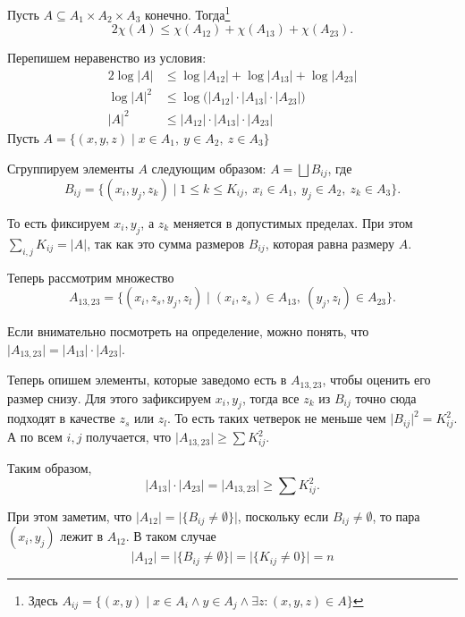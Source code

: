 \begin{lm}
	Пусть $ A \subseteq A_1 \times A_2 \times A_3$ конечно.
	Тогда\footnote{Здесь $ A_{ij} = \{(x, y) \mid x \in A_i \land y \in  A_j \land \exists z\colon  (x, y, z) \in A \}$}
	\[
		2 \chi(A) \le \chi(A_{12}) + \chi(A_{13}) + \chi(A_{23})
	.\] 
\end{lm}
\begin{proof*}
	Перепишем неравенство из условия:
	\begin{align*}
		2 \log \lvert A \rvert &\le \log \lvert A_{12} \rvert  + \log  \lvert A_{13} \rvert  + \log \lvert A_{23} \rvert  \\
		\log \lvert A \rvert^2 & \le \log \bigl(\lvert A_{12} \rvert \cdot \lvert A_{13} \rvert \cdot \lvert A_{23} \rvert\bigr)   \\
		\lvert A \rvert ^2 &\le \lvert A_{12} \rvert \cdot \lvert A_{13} \rvert \cdot \lvert A_{23} \rvert \tag{$ \log$  --- возрастающая функция}  
	\end{align*}
	Пусть $ A = \{(x, y, z) \mid x \in A_1 , ~ y \in A_2 , ~ z \in A_3\}$

	Сгруппируем элементы $ A$ следующим образом: $ A = \bigsqcup B_{ij}$, где 
	$$ B_{ij} = \{(x_i, y_j, z_k) \mid 1 \le k \le K_{ij} , ~ x_i \in A_1 , ~ y_j \in  A_2 , ~ z_k \in A_3\}.$$

	То есть фиксируем $ x_i, y_j$, а $ z_k$ меняется в допустимых пределах. 
	При этом $ \sum_{i, j} K_{ij} = \lvert A \rvert $, так как это сумма размеров $ B_{ij}$, которая равна размеру $ A$. 
	
	Теперь рассмотрим множество 
	\[
		A_{13, 23} = \{(x_i, z_s, y_j, z_l) \mid (x_i, z_s) \in A_{13}, ~ (y_j, z_l)  \in A_{23}\}
	.\] 

	Если внимательно посмотреть на определение, можно понять, что $ \lvert A_{13, 23} \rvert = \lvert A_{13} \rvert \cdot \lvert A_{23} \rvert $.

	Теперь опишем элементы, которые заведомо есть в $ A_{13, 23}$, чтобы оценить его размер снизу.
	Для этого зафиксируем $ x_i, y_j$, тогда все $ z_k$ из $ B_{ij}$ точно сюда подходят в качестве $ z_s$ или $ z_l$.
	То есть таких четверок не меньше чем $ \lvert B_{ij}\rvert^2 = K_{ij}^2$. 
	А по всем $ i, j$ получается, что $ \lvert A_{13,23}  \rvert \ge \sum K_{ij}^2$.

	Таким образом,
	\[
		\lvert A_{13} \rvert 	\cdot  \lvert A_{23} \rvert  = \lvert A_{13,23} \rvert \ge \sum K_{ij}^2 
	.\] 

    При этом заметим, что 
    $\lvert A_{12} \rvert = \lvert\{B_{ij} \neq \emptyset \}\rvert$, поскольку если $B_{ij} \neq \emptyset$, то пара $(x_i, y_j)$ лежит в $A_{12}$. В таком случае 
    $$\lvert A_{12} \rvert = \lvert \{ B_{ij} \neq \emptyset \} \rvert = \lvert \{ K_{ij} \neq 0 \} \rvert = n$$


\end{proof*}
